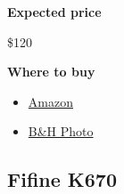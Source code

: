 \begin{gram}
\textbf{Expected price}

\$120

\textbf{Where to buy}

\begin{itemize}

\item \href{https://www.amazon.com/Samson-Wireless-Microphone-System-SWXPD2BLM8/dp/B07HPRZBKC/ref=sr_1_6?crid=3V47B7B3X9SJ5&keywords=wireless+usb+lapel+microphone&qid=1582899680&sprefix=Wireless+USB+lapel+,aps,143&sr=8-6}{Amazon}

\item 
\href{https://www.bhphotovideo.com/c/product/1440151-REG/samson_swxpd2blm8_xpd2_lavalier_usb_wireless.html/?ap=y&ap=y&smp=y&smp=y&lsft=BI%3A514&gclid=EAIaIQobChMIiIOHy-_06QIVUopaBR150wxWEAQYASABEgJL5vD_BwE}{B\&H Photo}
\end{itemize}
\end{gram}

\subsection{Fifine K670}
\label{sec:equipment::fifine}


